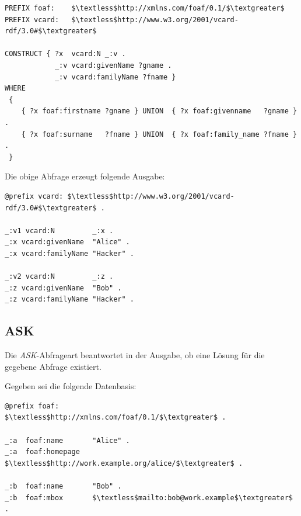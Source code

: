 \begin{lstlisting}
PREFIX foaf:    $\textless$http://xmlns.com/foaf/0.1/$\textgreater$
PREFIX vcard:   $\textless$http://www.w3.org/2001/vcard-rdf/3.0#$\textgreater$

CONSTRUCT { ?x  vcard:N _:v .
            _:v vcard:givenName ?gname .
            _:v vcard:familyName ?fname }
WHERE
 {
    { ?x foaf:firstname ?gname } UNION  { ?x foaf:givenname   ?gname } .
    { ?x foaf:surname   ?fname } UNION  { ?x foaf:family_name ?fname } .
 }
\end{lstlisting}

Die obige Abfrage erzeugt folgende Ausgabe:
\begin{lstlisting}
@prefix vcard: $\textless$http://www.w3.org/2001/vcard-rdf/3.0#$\textgreater$ .

_:v1 vcard:N         _:x .
_:x vcard:givenName  "Alice" .
_:x vcard:familyName "Hacker" .

_:v2 vcard:N         _:z .
_:z vcard:givenName  "Bob" .
_:z vcard:familyName "Hacker" .
\end{lstlisting}

\subsection{ASK}
\label{subsec:sparql_abfragearten_ask}
Die \textit{ASK}-Abfrageart beantwortet in der Ausgabe, ob eine Lösung für die gegebene Abfrage existiert.

Gegeben sei die folgende Datenbasis:
\lstset{language=XML}
\begin{lstlisting}
@prefix foaf:       $\textless$http://xmlns.com/foaf/0.1/$\textgreater$ .

_:a  foaf:name       "Alice" .
_:a  foaf:homepage   $\textless$http://work.example.org/alice/$\textgreater$ .

_:b  foaf:name       "Bob" .
_:b  foaf:mbox       $\textless$mailto:bob@work.example$\textgreater$ .
\end{lstlisting}

